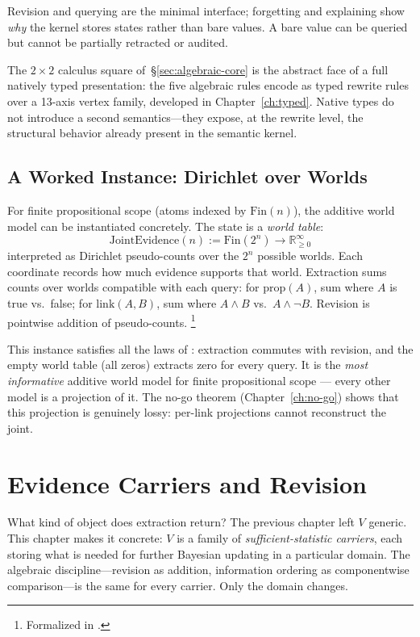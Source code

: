 \documentclass[11pt,openany]{report}
\begin{document}
\noindent
Revision and querying are the minimal interface; forgetting and
explaining show \emph{why} the kernel stores states rather than bare
values.  A bare value can be queried but cannot be partially retracted
or audited.

The $2 \times 2$ calculus square of~\S\ref{sec:algebraic-core} is
the abstract face of a full natively typed presentation: the five
algebraic rules encode as typed rewrite rules over a 13-axis vertex
family, developed in Chapter~\ref{ch:typed}.  Native types do not
introduce a second semantics---they expose, at the rewrite level, the
structural behavior already present in the semantic kernel.


\section{A Worked Instance: Dirichlet over Worlds}

For finite propositional scope (atoms indexed by $\mathrm{Fin}(n)$),
the additive world model can be instantiated concretely.  The state is
a \emph{world table}:
\[
  \mathrm{JointEvidence}(n) := \mathrm{Fin}(2^n) \to
  \mathbb{R}_{\ge 0}^{\infty}
\]
interpreted as Dirichlet pseudo-counts over the $2^n$ possible worlds.
Each coordinate records how much evidence supports that world.
Extraction sums counts over worlds compatible with each query:
for $\mathrm{prop}(A)$, sum where $A$ is true vs.\ false; for
$\mathrm{link}(A, B)$, sum where $A \wedge B$ vs.\ $A \wedge \neg B$.
Revision is pointwise addition of pseudo-counts.%
\footnote{Formalized in
.}

This instance satisfies all the laws of
: extraction commutes with revision, and the
empty world table (all zeros) extracts zero for every query.  It is
the \emph{most informative} additive world model for finite
propositional scope --- every other model is a projection of it.
The no-go theorem (Chapter~\ref{ch:no-go}) shows that this
projection is genuinely lossy: per-link projections cannot
reconstruct the joint.


\chapter{Evidence Carriers and Revision}
\label{ch:evidence}

What kind of object does extraction return?  The previous chapter left
$V$ generic.  This chapter makes it concrete: $V$ is a family of
\emph{sufficient-statistic carriers}, each storing what is needed for
further Bayesian updating in a particular domain.  The algebraic
discipline---revision as addition, information ordering as componentwise
comparison---is the same for every carrier.  Only the domain changes.
\end{document}
